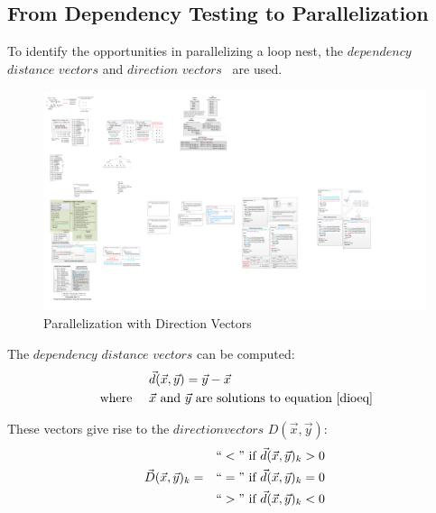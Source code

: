 \subsection{From Dependency Testing to Parallelization}
\label{sec:fdtp}

To identify the opportunities in parallelizing a loop nest, the $dependency$ $distance$ $vectors$ and $direction$ $vectors$~\cite{opac-b1000180} are used.

\begin{figure}[htp]
\begin{center}
\includegraphics[width=1.0\linewidth]{chap6fig/paral2.pdf}
\caption{Parallelization with Direction Vectors
\label{fig:paral}}
\end{center}
\end{figure}
The $dependency$ $distance$ $vectors$ can be computed:
\begin{equation*}
\begin{aligned}
&  & & \vec{d}(\vec{x},\vec{y}) = \vec{y}-\vec{x} \\
& \text{ where }&   & \vec{x} \text{ and }\vec{y} \text{ are solutions to equation~\ref{dioeq}}  
\end{aligned}
\end{equation*}

These vectors give rise to the $direction vectors$ $D(\vec{x},\vec{y})$:
\begin{equation*}
\begin{aligned}
  & & ``<" \text{ if } \vec{d}(\vec{x},\vec{y})_k>0 \\
 \vec{D}(\vec{x},\vec{y})_k = &   & ``=" \text{ if } \vec{d}(\vec{x},\vec{y})_k=0\\
 & & ``>" \text{ if } \vec{d}(\vec{x},\vec{y})_k<0
\end{aligned}
\end{equation*}


